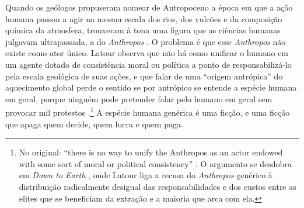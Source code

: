 Quando os geólogos propuseram nomear de Antropoceno a época em que a ação humana passou a agir na mesma escala dos rios, dos vulcões e da composição química da atmosfera, trouxeram à tona uma figura que as ciências humanas julgavam ultrapassada, a do \textit{Anthropos} \parencite[p.~117]{Latour2017FacingGaia}. O problema é que esse \textit{Anthropos} não existe como ator único. Latour observa que não há como unificar o humano em um agente dotado de consistência moral ou política a ponto de responsabilizá-lo pela escala geológica de suas ações, e que falar de uma \enquote{origem antrópica} do aquecimento global perde o sentido se por antrópico se entende a espécie humana em geral, porque ninguém pode pretender falar pelo humano em geral sem provocar mil protestos \parencite[pp.~120--121]{Latour2017FacingGaia}.\footnote{No original: \enquote{there is no way to unify the Anthropos as an actor endowed with some sort of moral or political consistency} \parencite[p.~121, tradução minha]{Latour2017FacingGaia}. O argumento se desdobra em \textit{Down to Earth} \parencite{Latour2018DownToEarth}, onde Latour liga a recusa do \textit{Anthropos} genérico à distribuição radicalmente desigual das responsabilidades e dos custos entre as elites que se beneficiam da extração e a maioria que arca com ela.} A espécie humana genérica é uma ficção, e uma ficção que apaga quem decide, quem lucra e quem paga.

